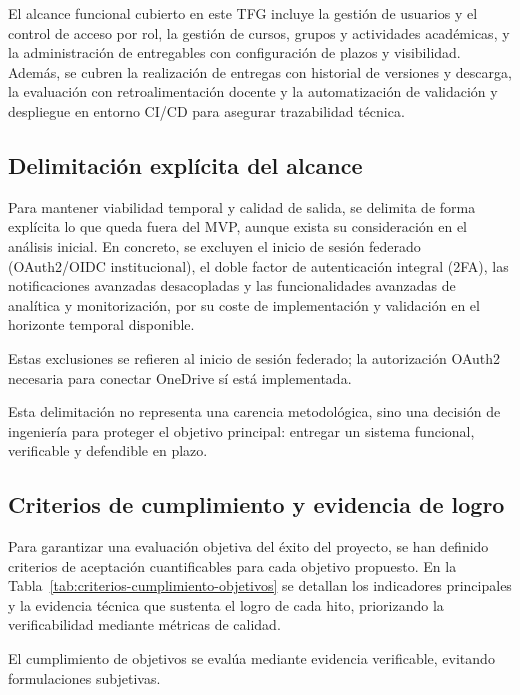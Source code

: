 \medskip

El alcance funcional cubierto en este TFG incluye la gesti\'on de usuarios y el control de acceso por rol, la gesti\'on de cursos, grupos y actividades acad\'emicas, y la administraci\'on de entregables con configuraci\'on de plazos y visibilidad. Adem\'as, se cubren la realizaci\'on de entregas con historial de versiones y descarga, la evaluaci\'on con retroalimentaci\'on docente y la automatizaci\'on de validaci\'on y despliegue en entorno CI/CD para asegurar trazabilidad t\'ecnica.

\subsection{Delimitaci\'on expl\'icita del alcance}

Para mantener viabilidad temporal y calidad de salida,
se delimita de forma expl\'icita lo que queda fuera del MVP,
aunque exista su consideraci\'on en el an\'alisis inicial. En concreto, se excluyen el inicio de sesi\'on federado (OAuth2/OIDC institucional), el doble factor de autenticaci\'on integral (2FA), las notificaciones avanzadas desacopladas y las funcionalidades avanzadas de anal\'itica y monitorizaci\'on, por su coste de implementaci\'on y validaci\'on en el horizonte temporal disponible.

Estas exclusiones se refieren al inicio de sesi\'on federado; la autorizaci\'on OAuth2 necesaria para conectar OneDrive s\'i est\'a implementada.

Esta delimitaci\'on no representa una carencia metodol\'ogica,
sino una decisi\'on de ingenier\'ia para proteger el objetivo principal:
entregar un sistema funcional, verificable y defendible en plazo.

\subsection{Criterios de cumplimiento y evidencia de logro}

Para garantizar una evaluaci\'on objetiva del \'exito del proyecto, se han definido criterios de aceptaci\'on cuantificables para cada objetivo propuesto. En la Tabla~\ref{tab:criterios-cumplimiento-objetivos} se detallan los indicadores principales y la evidencia t\'ecnica que sustenta el logro de cada hito, priorizando la verificabilidad mediante m\'etricas de calidad.

El cumplimiento de objetivos se eval\'ua mediante evidencia verificable,
evitando formulaciones subjetivas.

